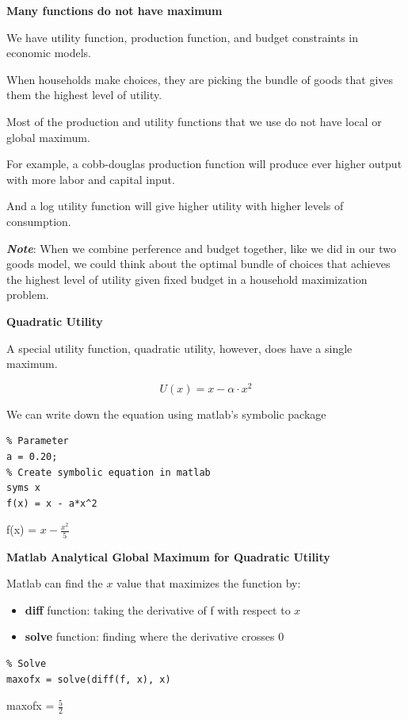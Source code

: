 \documentclass[
]{book}
\begin{document}
\textbf{Many functions do not have maximum}

We have utility function, production function, and budget constraints in
economic models.

When households make choices, they are picking the bundle of goods that
gives them the highest level of utility.

Most of the production and utility functions that we use do not have
local or global maximum.

For example, a cobb-douglas production function will produce ever higher
output with more labor and capital input.

And a log utility function will give higher utility with higher levels
of consumption.

\textbf{\emph{Note}}: When we combine perference and budget together, like we did
in our two goods model, we could think about the optimal bundle of
choices that achieves the highest level of utility given fixed budget in
a household maximization problem.

\textbf{Quadratic Utility}

A special utility function, quadratic utility, however, does have a
single maximum.

\[U(x)=x-\alpha \cdot x^2\]

We can write down the equation using matlab's symbolic package

\begin{verbatim}
% Parameter
a = 0.20;
% Create symbolic equation in matlab
syms x
f(x) = x - a*x^2
\end{verbatim}

f(x) = \(\displaystyle x-\frac{x^2 }{5}\)

\textbf{Matlab Analytical Global Maximum for Quadratic Utility}

Matlab can find the \(x\) value that maximizes the function by:

\begin{itemize}
\item
  \textbf{diff} function: taking the derivative of f with respect to \(x\)
\item
  \textbf{solve} function: finding where the derivative crosses \(0\)
\end{itemize}

\begin{verbatim}
% Solve
maxofx = solve(diff(f, x), x)
\end{verbatim}

maxofx = \(\displaystyle \frac{5}{2}\)
\end{document}

